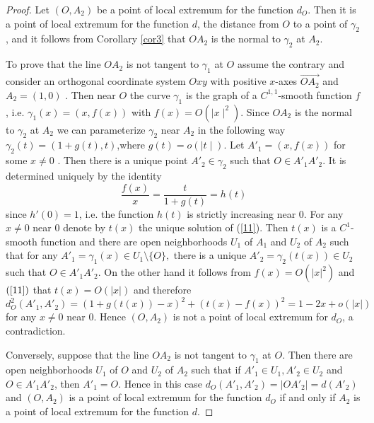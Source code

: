\documentclass[a4paper,12pt]{amsart}
\def\g{\gamma}
\begin{document}
\begin{proof} Let $(O,A_2)$ be a point of local extremum for the function
$d_O$. Then it is a point of local extremum  for the function $d$,
the distance from $O$ to a point of $\g_2$, and it follows from
Corollary \ref{cor3} that  $OA_2$ is the normal to $\g_2$ at
$A_2$.

To prove that the line $OA_2$ is not tangent to $\g_1$ at $O$
assume the contrary and consider an orthogonal coordinate system
$Oxy$ with positive $x$-axes $\overrightarrow{OA_2}$ and
$A_2=(1,0)$ . Then near $O$ the curve $\g_1$ is the graph of a
$C^{1,1}$-smooth function $f$ , i.e. $\g_1(x)=(x,f(x))$ with
$f(x)=O(\mid x\mid^2)$. Since $OA_2$ is the normal to $\g_2$ at
$A_2$ we can parameterize $\g_2$ near $A_2$ in the following way
$\g_2(t)=(1+g(t) , t)$,where $g(t)=o(\mid t\mid)$. Let
$A'_1=(x,f(x))$ for some $ x\neq 0$ . Then there is a unique point
$A'_2\in \g_2$ such that $O\in A'_1A'_2$. It is determined
uniquely by the identity
\begin{equation}\label{11}
\frac{f(x)}{x}=\frac{t}{1+g(t)}=h(t)
\end{equation}
since $h'(0)=1$, i.e. the function $h(t)$ is strictly increasing
near $0$. For any $x\neq 0$ near $0$ denote by $t(x)$ the unique
solution of (\ref{11}). Then $t(x)$ is a $C^1$-smooth function and
there are open neighborhoods $U_1$ of $A_1$ and $U_2$ of $A_2$
such that for any $A'_1=\g_1(x)\in U_1\setminus\{O\}, $ there is a
unique $A'_2=\g_2(t(x))\in U_2$ such that $O\in A'_1A'_2$. On the
other hand it follows from $f(x)=O(|x|^2)$ and $(\ref{11})$
that $t(x)=O(|x|)$ and therefore
$$d^2_O(A'_1,A'_2)=(1+g(t(x))-x)^2 +(t(x)-f(x))^2=1-2x+o(|x|)$$
for any $x\neq 0$ near $0$. Hence $(O,A_2)$ is not a point of local
extremum for $d_O$, a contradiction.

Conversely, suppose that the line $OA_2$ is not tangent to $\g_1$
at $O$. Then there are open neighborhoods $U_1$ of $O$ and $U_2$
of $A_2$ such that if $A'_1\in U_1, A'_2\in U_2$ and $O\in
A'_1A'_2$, then $A'_1=O$. Hence in this case
$d_O(A'_1,A'_2)=|OA'_2| = d(A'_2)$ and $(O,A_2)$ is a point of local
extremum for the function $d_O$ if and only if $A_2$ is a point of
local extremum for the function $d$.
\end{proof}
\end{document}
